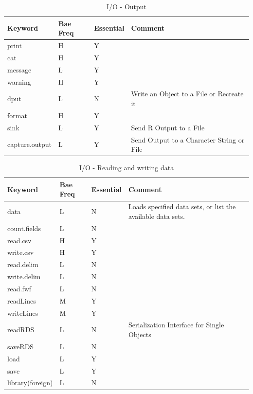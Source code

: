 \documentclass[10pt,]{krantz}
\theoremstyle{definition}
\theoremstyle{definition}
\theoremstyle{remark}
\begin{document}
\begin{table}

\caption{\label{tab:knitchunk24}I/O - Output}
\centering
\begin{tabular}[t]{llll}
\toprule
Keyword & Bae Freq & Essential & Comment\\
\midrule
print & H & Y & \\
cat & H & Y & \\
message & L & Y & \\
warning & H & Y & \\
dput & L & N & Write an Object to a File or Recreate it\\
\addlinespace
format & H & Y & \\
sink & L & Y & Send R Output to a File\\
capture.output & L & Y & Send Output to a Character String or File\\
\bottomrule
\end{tabular}
\end{table}

\begin{table}

\caption{\label{tab:knitchunk25}I/O - Reading and writing data}
\centering
\begin{tabular}[t]{llll}
\toprule
Keyword & Bae Freq & Essential & Comment\\
\midrule
data & L & N & Loads specified data sets, or list the available data sets.\\
count.fields & L & N & \\
read.csv & H & Y & \\
write.csv & H & Y & \\
read.delim & L & N & \\
\addlinespace
write.delim & L & N & \\
read.fwf & L & N & \\
readLines & M & Y & \\
writeLines & M & Y & \\
readRDS & L & N & Serialization Interface for Single Objects\\
\addlinespace
saveRDS & L & N & \\
load & L & Y & \\
save & L & Y & \\
library(foreign) & L & N & \\
\bottomrule
\end{tabular}
\end{table}
\end{document}
